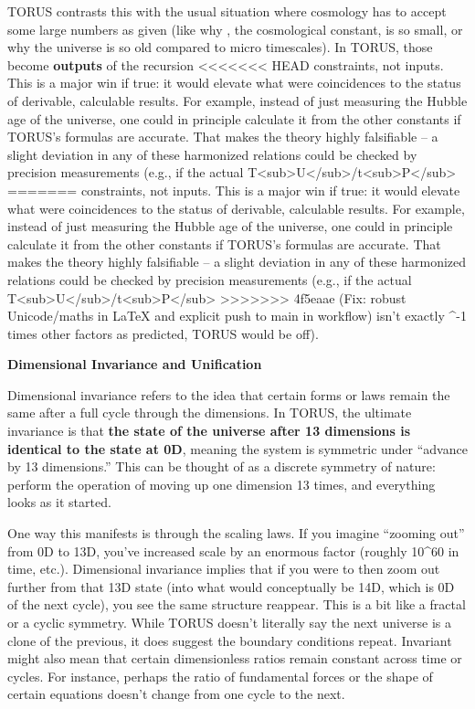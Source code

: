 \documentclass[]{article}
\begin{document}
TORUS contrasts this with the usual situation where cosmology has to
accept some large numbers as given (like why \Lambda, the cosmological
constant, is so small, or why the universe is so old compared to micro
timescales). In TORUS, those become \textbf{outputs} of the recursion
<<<<<<< HEAD
constraints, not inputs\hspace{0pt}. This is a major win if true: it
would elevate what were coincidences to the status of derivable,
calculable results\hspace{0pt}. For example, instead of just measuring
the Hubble age of the universe, one could in principle calculate it from
the other constants if TORUS's formulas are accurate. That makes the
theory highly falsifiable -- a slight deviation in any of these
harmonized relations could be checked by precision measurements (e.g.,
if the actual
T\textless sub\textgreater U\textless/sub\textgreater/t\textless sub\textgreater P\textless/sub\textgreater{}
=======
constraints, not inputs​. This is a major win if true: it would elevate
what were coincidences to the status of derivable, calculable results​.
For example, instead of just measuring the Hubble age of the universe,
one could in principle calculate it from the other constants if TORUS's
formulas are accurate. That makes the theory highly falsifiable -- a
slight deviation in any of these harmonized relations could be checked
by precision measurements (e.g., if the actual
T\textless{}sub\textgreater{}U\textless{}/sub\textgreater{}/t\textless{}sub\textgreater{}P\textless{}/sub\textgreater{}
>>>>>>> 4f5eaae (Fix: robust Unicode/maths in LaTeX and explicit push to main in workflow)
isn't exactly \alpha\^{}-1 times other factors as predicted, TORUS would be
off).

\textbf{Dimensional Invariance and Unification}

Dimensional invariance refers to the idea that certain forms or laws
remain the same after a full cycle through the dimensions. In TORUS, the
ultimate invariance is that \textbf{the state of the universe after 13
dimensions is identical to the state at 0D}, meaning the system is
symmetric under ``advance by 13 dimensions.'' This can be thought of as
a discrete symmetry of nature: perform the operation of moving up one
dimension 13 times, and everything looks as it started​.

One way this manifests is through the scaling laws. If you imagine
``zooming out'' from 0D to 13D, you've increased scale by an enormous
factor (roughly 10\^{}60 in time, etc.). Dimensional invariance implies
that if you were to then zoom out further from that 13D state (into what
would conceptually be 14D, which is 0D of the next cycle), you see the
same structure reappear. This is a bit like a fractal or a cyclic
symmetry. While TORUS doesn't literally say the next universe is a clone
of the previous, it does suggest the boundary conditions repeat.
Invariant might also mean that certain dimensionless ratios remain
constant across time or cycles. For instance, perhaps the ratio of
fundamental forces or the shape of certain equations doesn't change from
one cycle to the next.
\end{document}
